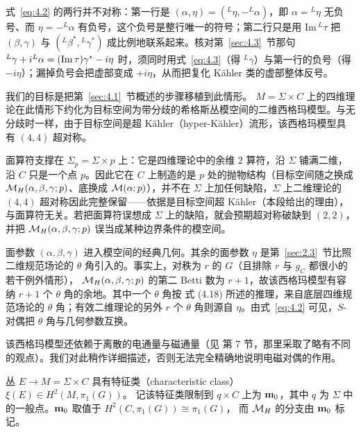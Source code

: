 \begin{yizhu}[易错点]
式~\eqref{eq:4.2} 的两行并不对称：第一行是 $(\alpha,\eta)=({}^L\eta,-{}^L\alpha)$，即 $\alpha={}^L\eta$ 无负号、而 $\eta=-{}^L\alpha$ 有负号，这个负号是整行唯一的符号；第二行只是用 $\mathrm{Im}\,{}^L\tau$ 把 $(\beta,\gamma)$ 与 $({}^L\beta^*,{}^L\gamma^*)$ 成比例地联系起来。核对第~\ref{sec:4.3}~节那句 ${}^L\gamma+i{}^L\alpha=({\rm Im}\,\tau)\gamma^*-i\eta$ 时，须同时用式~\eqref{eq:4.3}（得 ${}^L\gamma$）与第一行的负号（得 $-i\eta$）；漏掉负号会把虚部变成 $+i\eta$，从而把复化 Kähler 类的虚部整体反号。
\end{yizhu}

我们的目标是把第~\ref{sec:4.1}~节概述的步骤移植到此情形。
$M=\Sigma\times C$ 上的四维理论在此情形下约化为目标空间为带分歧的希格斯丛模空间的二维西格玛模型。与无分歧时一样，由于目标空间是超 Kähler（hyper-Kähler）流形，该西格玛模型具有 $(4,4)$
超对称。

\begin{yizhu}[易错点]
面算符支撑在 $\Sigma_p=\Sigma\times p$ 上：它是四维理论中的余维 $2$ 算符，沿 $\Sigma$ 铺满二维，沿 $C$ 只是一个点 $p$。因此它在 $C$ 上制造的是 $p$ 处的抛物结构（目标空间随之换成 ${{\mathcal{M}}_H}(\alpha,\beta,\gamma;p)$、底换成 ${\mathcal{M}}(\alpha;p)$），并不在 $\Sigma$ 上加任何缺陷，$\Sigma$ 上二维理论的 $(4,4)$ 超对称因此完整保留——依据是目标空间超 Kähler（本段给出的理由），与面算符无关。若把面算符误想成 $\Sigma$ 上的缺陷，就会预期超对称破缺到 $(2,2)$，并把 ${{\mathcal{M}}_H}(\alpha,\beta,\gamma;p)$ 误当成某种边界条件的模空间。
\end{yizhu}

面参数 $(\alpha,\beta,\gamma)$ 进入模空间的经典几何。其余的面参数 $\eta$ 是第~\ref{sec:2.3}~节比照二维规范场论的 $\theta$ 角引入的。事实上，对秩为 $r$ 的 $G$（且排除 $r$ 与 $g_C$ 都很小的若干例外情形），
${{\mathcal{M}}_H}(\alpha, \beta,\gamma;p)$ 的第二 Betti 数为 $r+1$，故该西格玛模型有容纳 $r+1$ 个 $\theta$ 角的余地。其中一个 $\theta$ 角按 \cite{ref8} 式 (4.18) 所述的推理，来自底层四维规范场论的 $\theta$ 角；有效二维理论的另外 $r$ 个 $\theta$ 角则源自 $\eta$。由式~\eqref{eq:4.2} 可见，$S$-对偶把 $\theta$ 角与几何参数互换。

\bigskip{}

该西格玛模型还依赖于离散的电通量与磁通量（见 \cite{ref8} 第 7 节，那里采取了略有不同的观点）。我们对此稍作详细描述，否则无法完全精确地说明电磁对偶的作用。

丛 $E\to M=\Sigma\times C$ 具有特征类（characteristic class）
$\xi(E)\in H^2(M,\pi_1(G))$。
记该特征类限制到 $q\times C$ 上为 ${\bf m}_0$，其中 $q$ 为 $\Sigma$ 中的一般点。${\bf m}_0$ 取值于 $H^2(C,\pi_1(G))\cong \pi_1(G)$，
而 ${{\mathcal{M}}_H}$ 的分支由 ${\bf m}_0$ 标记。

